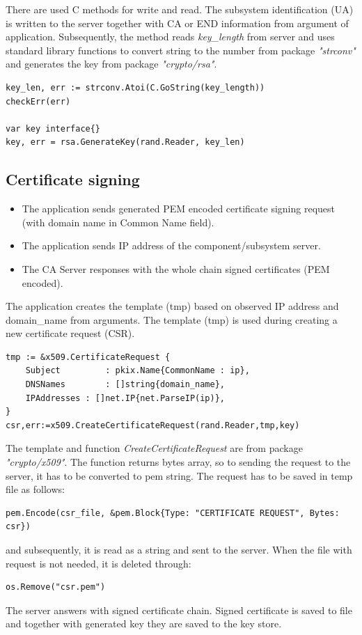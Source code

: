 \documentclass[
  twoside, 12pt, 
  printed, %
  notable,   %
  lof,     %
  lot,     %
]{fithesis3}
\begin{document}
There are used C methods for write and read. The subsystem identification (UA) is written to the 
server together with CA or END information from argument of application. Subsequently, the method 
reads \textit{key\_length} from server and uses standard library functions to convert string to the 
number from package \textit{"strconv"} and generates the key from package \textit{"crypto/rsa"}.

\begin{lstlisting}
key_len, err := strconv.Atoi(C.GoString(key_length))	
checkErr(err)

var key interface{}
key, err = rsa.GenerateKey(rand.Reader, key_len)
\end{lstlisting}
    
\subsection{Certificate signing}
\begin{itemize}[leftmargin=2em,rightmargin=1em,itemsep=0.75\parskip,parsep=0em,topsep=0em,partopsep=0em]
\item The application sends generated PEM encoded certificate signing request (with domain name in Common Name field).
\item The application sends IP address of the component/subsystem server.
\item The CA Server responses with the whole chain signed certificates (PEM encoded).
\end{itemize}

The application creates the template (tmp) based on observed IP address and domain\_name from 
arguments. The template (tmp) is used during creating a new certificate request (CSR). 

\begin{lstlisting}
tmp := &x509.CertificateRequest {
	Subject 		: pkix.Name{CommonName : ip},
	DNSNames 		: []string{domain_name},
	IPAddresses : []net.IP{net.ParseIP(ip)},
}
csr,err:=x509.CreateCertificateRequest(rand.Reader,tmp,key)
\end{lstlisting}

The template and function \textit{CreateCertificateRequest} are from package 
\textit{"crypto/x509"}. The function returns bytes array, so to sending the request to the server, 
it has to be converted to pem string. The request has to be saved in temp file as follows:
\begin{lstlisting}
pem.Encode(csr_file, &pem.Block{Type: "CERTIFICATE REQUEST", Bytes: csr})
\end{lstlisting}
and subsequently, it is read as a string and sent to the server. When the file with request is not 
needed, it is deleted through:
\begin{lstlisting}
os.Remove("csr.pem")
\end{lstlisting}
The server answers with signed certificate chain. Signed certificate is saved to file and together 
with generated key they are saved to the key store.
\end{document}
